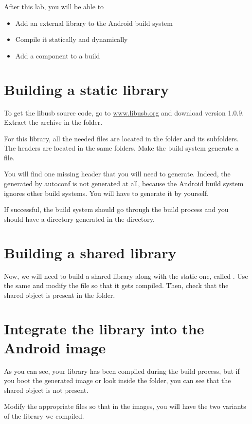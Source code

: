 
After this lab, you will be able to
\begin{itemize}
  \item Add an external library to the Android build system
  \item Compile it statically and dynamically
  \item Add a component to a build
\end{itemize}

\section{Building a static library}

To get the libusb source code, go to \url{www.libusb.org} and download
version 1.0.9. Extract the archive in the  folder.

For this library, all the needed  files are located in the 
folder and its subfolders. The headers are located in the same folders. Make
the build system generate a  file.

You will find one missing header that you will need to generate. Indeed, the
 generated by autoconf is not generated at all, because the
Android build system ignores other build systems. You will have to generate it
by yourself.

If successful, the build system should go through the build process and you
should have a directory generated in the  directory.

\section{Building a shared library}

Now, we will need to build a shared library along with the static one, called
. Use the same  and modify the 
file so that it gets compiled. Then, check that the shared object is present in
the  folder.

\section{Integrate the library into the Android image}

As you can see, your library has been compiled during the build process, but if
you boot the generated image or look inside the 
folder, you can see that the shared object is not present.

Modify the appropriate files so that in the images, you will have the two 
variants of the library we compiled.
